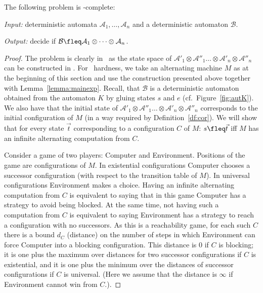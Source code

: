 \documentclass{LMCS}
\theoremstyle{plain}\newtheorem{remark}{Remark}
\theoremstyle{plain}\newtheorem{lemma}[thm]{Lemma}
\renewcommand{\Aa}{\mathcal{A}}
\renewcommand{\Bb}{\mathcal{B}}
\newcommand{\vect}{\vec t}
\newcommand{\vAap}{\Aa'_1\otimes\Aa''_1\dots\otimes\Aa'_n\otimes\Aa''_n}
\begin{document}
\begin{thm} \label{th:main}
  The following problem is \EXPTIME-complete:

\emph{Input:} deterministic automata
$\Aa_1,\dots,\Aa_n$  and a deterministic automaton $\Bb$.

\emph{Output:} decide if
$\Bb \fleq \Aa_1\otimes\dots\otimes\Aa_n$.

\end{thm}
\begin{proof}
  The problem is clearly in \EXPTIME\ as the state space of $\vAap$
  can be constructed in \EXPTIME. For \EXPTIME\ hardness, we take an
  alternating machine $M$ as at the beginning of this section and use
  the construction presented above together with
  Lemma~\ref{lemma:mainexp}. Recall, that $\Bb$ is a deterministic
  automaton obtained from the automaton $K$ by gluing states $s$ and
  $e$ (cf.\ Figure~\ref{fig:autK}). We also have that the initial
  state of $\vAap$ corresponds to the initial configuration of $M$ (in
  a way required by Definition~\ref{df:cor}). We will show that for
  every state $\vect$ corresponding to a configuration $C$ of $M$: $s\fleq
  \vect$ iff $M$ has an infinite alternating computation from $C$.

  Consider a game of two players: Computer and Environment. Positions
  of the game are configurations of $M$. In existential configurations
  Computer chooses a successor configuration (with respect to the
  transition table of $M$). In universal configurations Environment
  makes a choice. Having an infinite alternating computation from $C$
  is equivalent to saying that in this game Computer has a strategy to
  avoid being blocked. At the same time, not having such a computation
  from $C$ is equivalent to saying Environment has a strategy to reach
  a configuration with no successors. As this is a reachability game,
  for each such $C$ there is a bound $d_C$ (distance) on the number of
  steps in which Environment can force Computer into a blocking
  configuration. This distance is $0$ if $C$ is blocking; it is one
  plus the maximum over distances for two successor configurations if
  $C$ is existential, and it is one plus the minimum over the
  distances of successor configurations if $C$ is universal. (Here we
  assume that the distance is $\infty$ if Environment cannot win from
  $C$.).


\end{proof}
\end{document}
